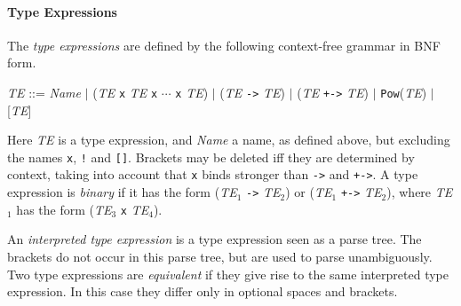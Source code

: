 \documentclass[adraft]{eptcs}
\newcommand{\aac}[1]{{\tt #1}}    %
\begin{document}
\paragraph{Type Expressions}
The \emph{type expressions} are defined by the following context-free grammar in BNF form.\vspace{-2ex}
\begin{center}
\textit{TE} ::= \textit{Name} $|$ (\textit{TE} {\tt x} \textit{TE} {\tt x} $\cdots$ {\tt x}  \textit{TE}) $|$
                (\textit{TE} {\tt ->} \textit{TE}) $|$
                (\textit{TE} {\tt +->} \textit{TE}) $|$ \aac{Pow}(\textit{TE}) $|$ [\textit{TE}]
\end{center}
Here \textit{TE} is a type expression, and \textit{Name} a name, as defined above, but excluding the
names {\tt x}, {\tt !} and {\tt []}.
Brackets may be deleted iff they are determined by context, taking into account that {\tt x} binds
stronger than {\tt ->} and {\tt +->}.
A type expression is \emph{binary} if it has the form
(\textit{TE}$_1$ {\tt ->} \textit{TE}$_2$) or
(\textit{TE}$_1$ {\tt +->} \textit{TE}$_2$), where \textit{TE}$_1$ has the form  (\textit{TE}$_3$ {\tt x} \textit{TE}$_4$).

An \emph{interpreted type expression} is a type expression seen as a parse tree. The brackets do not
occur in this parse tree, but are used to parse unambiguously. Two type expressions are
\emph{equivalent} if they give rise to the same interpreted type expression. In this case
they differ only in optional spaces and brackets.
\end{document}
